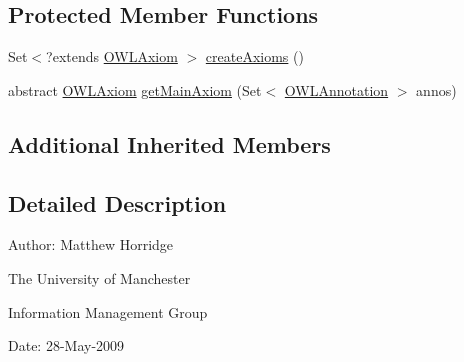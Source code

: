 \subsection*{Protected Member Functions}
\begin{DoxyCompactItemize}
\item 
Set$<$?extends \hyperlink{interfaceorg_1_1semanticweb_1_1owlapi_1_1model_1_1_o_w_l_axiom}{O\-W\-L\-Axiom} $>$ \hyperlink{classorg_1_1semanticweb_1_1owlapi_1_1api_1_1test_1_1baseclasses_1_1_abstract_annotated_axiom_round_tripping_test_case_ac24380072dbd37bf4a7deead5c191283}{create\-Axioms} ()
\item 
abstract \hyperlink{interfaceorg_1_1semanticweb_1_1owlapi_1_1model_1_1_o_w_l_axiom}{O\-W\-L\-Axiom} \hyperlink{classorg_1_1semanticweb_1_1owlapi_1_1api_1_1test_1_1baseclasses_1_1_abstract_annotated_axiom_round_tripping_test_case_a6afbb12cdaa7995823a6bb2a3a60ba8c}{get\-Main\-Axiom} (Set$<$ \hyperlink{interfaceorg_1_1semanticweb_1_1owlapi_1_1model_1_1_o_w_l_annotation}{O\-W\-L\-Annotation} $>$ annos)
\end{DoxyCompactItemize}
\subsection*{Additional Inherited Members}


\subsection{Detailed Description}
Author\-: Matthew Horridge\par
 The University of Manchester\par
 Information Management Group\par
 Date\-: 28-\/\-May-\/2009 

